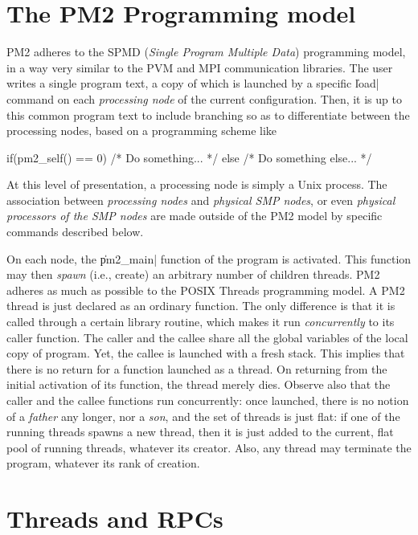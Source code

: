 \section{The PM2 Programming model}

PM2 adheres to the SPMD (\emph{Single Program Multiple Data})
programming model, in a way very similar to the PVM and MPI
communication libraries.  The user writes a single program text, a
copy of which is launched by a specific \|load| command on each
\emph{processing node} of the current configuration. Then,
it is up to this common program text to include branching so as to
differentiate between the processing nodes, based on a programming
scheme like
\begin{program}
if(pm2_self() == 0) { /* Do something... */ }
else { /* Do something else... */ }
\end{program}
At this level of presentation, a processing node is simply a Unix
process. The association between \emph{processing nodes} and
\emph{physical SMP nodes}, or even \emph{physical processors of the
  SMP nodes} are made outside of the PM2 model by specific commands
described below.


On each node, the \|pm2_main| function of the program is activated.
This function may then \emph{spawn} (i.e., create) an arbitrary
number of children threads.  PM2 adheres as much as possible to the
POSIX Threads programming model. A PM2 thread is just declared as an
ordinary function. The only difference is that it is called through a
certain library routine, which makes it run \emph{concurrently} to its
caller function. The caller and the callee share all the global
variables of the local copy of program. Yet, the callee is launched
with a fresh stack. This implies that there is no return for a
function launched as a thread. On returning from the initial
activation of its function, the thread merely dies.  Observe also that
the caller and the callee functions run concurrently: once launched,
there is no notion of a \emph{father} any longer, nor a \emph{son},
and the set of threads is just flat: if one of the running threads
spawns a new thread, then it is just added to the current, flat pool
of running threads, whatever its creator.  Also, any thread may
terminate the program, whatever its rank of creation.

\section{Threads and RPCs}

